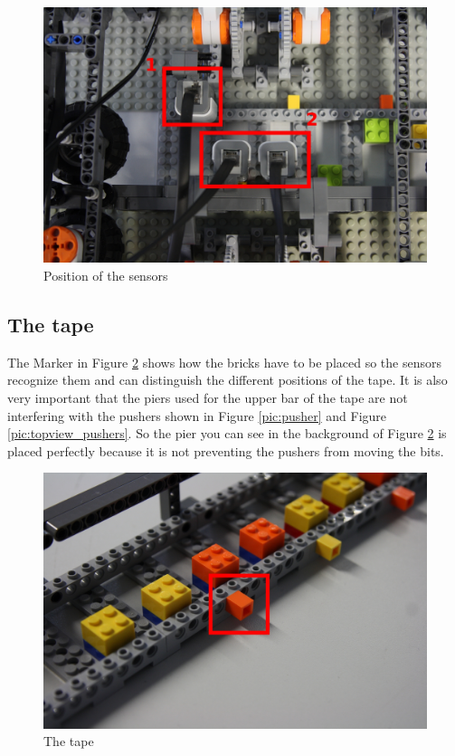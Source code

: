 \documentclass[%
  a4paper,%
  11pt,%
  blue,%
  hyperref	%
  ]{tubsartcl}
\begin{document}
\begin{figure}[!htb]
\begin{center}
\includegraphics[scale=0.3]{graphics_lego/sensors.jpg}
\end{center}
\caption{Position of the sensors}
\label{pic:sensors}
\end{figure}

\newpage

\subsection{The tape}

The Marker in Figure \ref{pic:tape} shows how the bricks have to be placed so the sensors recognize them and can distinguish the different positions of the tape. It is also very important that the piers used for the upper bar of the tape are not interfering with the pushers shown in Figure \ref{pic:pusher} and Figure \ref{pic:topview_pushers}. So the pier you can see in the background of Figure \ref{pic:tape} is placed perfectly because it is not preventing the pushers from moving the bits.

\begin{figure}[!htb]
\begin{center}
\includegraphics[scale=0.3]{graphics_lego/tape.jpg}
\end{center}
\caption{The tape}
\label{pic:tape}
\end{figure}
\end{document}
